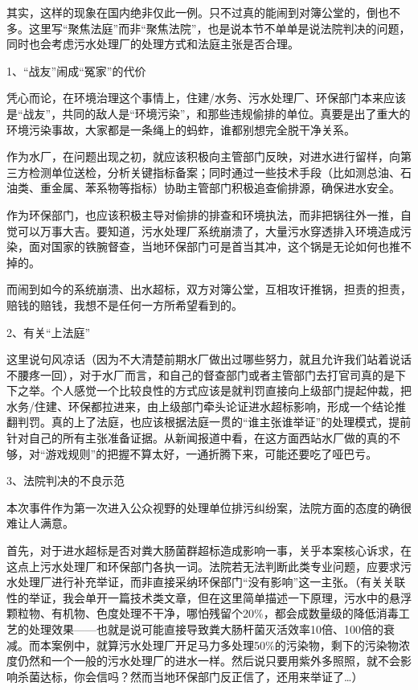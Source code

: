 \documentclass[
]{book}
\begin{document}
其实，这样的现象在国内绝非仅此一例。只不过真的能闹到对簿公堂的，倒也不多。这里写``聚焦法庭''而非``聚焦法院''，也是说本节不单单是说法院判决的问题，同时也会考虑污水处理厂的处理方式和法庭主张是否合理。

1、``战友''闹成``冤家''的代价

凭心而论，在环境治理这个事情上，住建/水务、污水处理厂、环保部门本来应该是``战友''，共同的敌人是``环境污染''，和那些违规偷排的单位。真要是出了重大的环境污染事故，大家都是一条绳上的蚂蚱，谁都别想完全脱干净关系。

作为水厂，在问题出现之初，就应该积极向主管部门反映，对进水进行留样，向第三方检测单位送检，分析关键指标备案；同时通过一些技术手段（比如测总油、石油类、重金属、苯系物等指标）协助主管部门积极追查偷排源，确保进水安全。

作为环保部门，也应该积极主导对偷排的排查和环境执法，而非把锅往外一推，自觉可以万事大吉。要知道，污水处理厂系统崩溃了，大量污水穿透排入环境造成污染，面对国家的铁腕督查，当地环保部门可是首当其冲，这个锅是无论如何也推不掉的。

而闹到如今的系统崩溃、出水超标，双方对簿公堂，互相攻讦推锅，担责的担责，赔钱的赔钱，我想不是任何一方所希望看到的。

2、有关``上法庭''

这里说句风凉话（因为不大清楚前期水厂做出过哪些努力，就且允许我们站着说话不腰疼一回），对于水厂而言，和自己的督查部门或者主管部门去打官司真的是下下之举。个人感觉一个比较良性的方式应该是就判罚直接向上级部门提起仲裁，把水务/住建、环保都拉进来，由上级部门牵头论证进水超标影响，形成一个结论推翻判罚。真的上了法庭，也应该根据法庭一贯的``谁主张谁举证''的处理模式，提前针对自己的所有主张准备证据。从新闻报道中看，在这方面西站水厂做的真的不够，对``游戏规则''的把握不算太好，一通折腾下来，可能还要吃了哑巴亏。

3、法院判决的不良示范

本次事件作为第一次进入公众视野的处理单位排污纠纷案，法院方面的态度的确很难让人满意。

首先，对于进水超标是否对粪大肠菌群超标造成影响一事，关乎本案核心诉求，在这点上污水处理厂和环保部门各执一词。法院若无法判断此类专业问题，应要求污水处理厂进行补充举证，而非直接采纳环保部门``没有影响''这一主张。（有关关联性的举证，我会单开一篇技术类文章，但在这里简单描述一下原理，污水中的悬浮颗粒物、有机物、色度处理不干净，哪怕残留个20\%，都会成数量级的降低消毒工艺的处理效果------也就是说可能直接导致粪大肠杆菌灭活效率10倍、100倍的衰减。而本案例中，就算污水处理厂开足马力多处理50\%的污染物，剩下的污染物浓度仍然和一个一般的污水处理厂的进水一样。然后说只要用紫外多照照，就不会影响杀菌达标，你会信吗？然而当地环保部门反正信了，还用来举证了\ldots）
\end{document}
